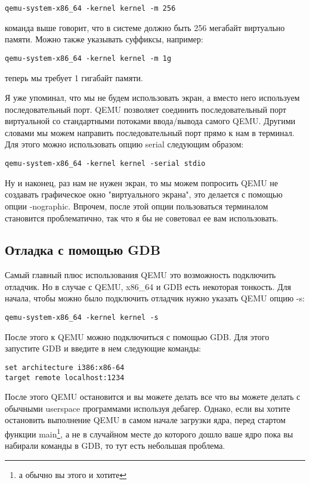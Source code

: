 \begin{verbatim}
qemu-system-x86_64 -kernel kernel -m 256
\end{verbatim}

команда выше говорит, что в системе должно быть 256 мегабайт виртуально памяти.
Можно также указывать суффиксы, например:

\begin{verbatim}
qemu-system-x86_64 -kernel kernel -m 1g
\end{verbatim}

теперь мы требует 1 гигабайт памяти.

Я уже упоминал, что мы не будем использовать экран, а вместо него используем
последовательный порт. QEMU позволяет соединить последовательный порт
виртуальной со стандартными потоками ввода/вывода самого QEMU. Другими словами
мы можем направить последовательный порт прямо к нам в терминал. Для этого можно
использовать опцию serial следующим образом:

\begin{verbatim}
qemu-system-x86_64 -kernel kernel -serial stdio
\end{verbatim}

Ну и наконец, раз нам не нужен экран, то мы можем попросить QEMU не создавать
графическое окно "виртуального экрана", это делается с помощью опции -nographic.
Впрочем, после этой опции пользоваться терминалом становится проблематично, так
что я бы не советовал ее вам использовать.

\subsection{Отладка с помощью GDB}

Самый главный плюс использования QEMU это возможность подключить отладчик. Но
в случае с QEMU, x86\_64 и GDB есть некоторая тонкость. Для начала, чтобы можно
было подключить отладчик нужно указать QEMU опцию -s:

\begin{verbatim}
qemu-system-x86_64 -kernel kernel -s
\end{verbatim}

После этого к QEMU можно подключиться с помощью GDB. Для этого запустите GDB и
введите в нем следующие команды:

\begin{verbatim}
set architecture i386:x86-64
target remote localhost:1234
\end{verbatim}

После этого QEMU остановится и вы можете делать все что вы можете делать с
обычными userspace программами используя дебагер. Однако, если вы хотите
остановить выполнение QEMU в самом начале загрузки ядра, перед стартом функции
main\footnote{а обычно вы этого и хотите}, а не в случайном месте до которого
дошло ваше ядро пока вы набирали команды в GDB, то тут есть небольшая проблема.

